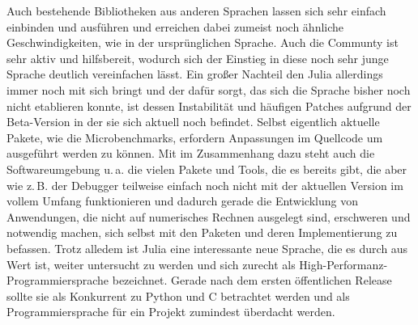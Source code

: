 \documentclass[proseminar,german,utf8]{zihpub}
\newcommand{\zB}[0]{{z.\,B. }}
\newcommand{\ua}[0]{{u.\,a. }}
\begin{document}
Auch bestehende Bibliotheken aus anderen Sprachen lassen sich sehr einfach einbinden und ausführen und erreichen dabei zumeist noch ähnliche Geschwindigkeiten, wie in der ursprünglichen Sprache. Auch die Communty ist sehr aktiv und hilfsbereit, wodurch sich der Einstieg in diese noch sehr junge Sprache deutlich vereinfachen lässt. Ein großer Nachteil den Julia allerdings immer noch mit sich bringt und der dafür sorgt, das sich die Sprache bisher noch nicht etablieren konnte, ist dessen Instabilität und häufigen Patches aufgrund der Beta-Version in der sie sich aktuell noch befindet. Selbst eigentlich aktuelle Pakete, wie die Microbenchmarks, erfordern Anpassungen im Quellcode um ausgeführt werden zu können. Mit im Zusammenhang dazu steht auch die Softwareumgebung \ua die vielen Pakete und Tools, die es bereits gibt, die aber wie \zB der Debugger teilweise einfach noch nicht mit der aktuellen Version im vollem Umfang funktionieren und dadurch gerade die Entwicklung von Anwendungen, die nicht auf numerisches Rechnen ausgelegt sind, erschweren und notwendig machen, sich selbst mit den Paketen und deren Implementierung zu befassen. Trotz alledem ist Julia eine interessante neue Sprache, die es durch aus Wert ist, weiter untersucht zu werden und sich zurecht als High-Performanz-Programmiersprache bezeichnet. Gerade nach dem ersten öffentlichen Release sollte sie als Konkurrent zu Python und C betrachtet werden und als Programmiersprache für ein Projekt zumindest überdacht werden.
\end{document}
